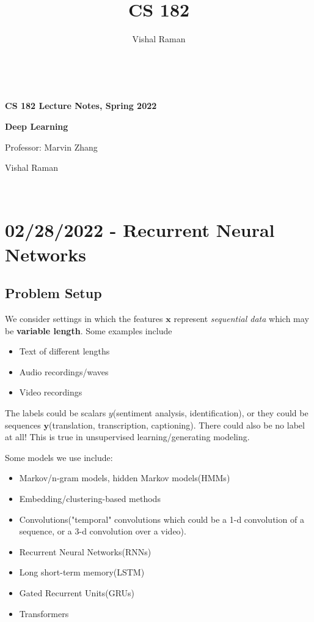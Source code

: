 \documentclass[11pt]{scrartcl}
\begin{document}
\title{CS 182}
\author{Vishal Raman}
\thispagestyle{empty}
$ $
\vfill
\begin{center}

\centerline{\huge \textbf{CS 182 Lecture Notes, Spring 2022}}
\centerline{\Large \textbf{Deep Learning} } 
\centerline{Professor: Marvin Zhang}
\centerline{Vishal Raman}
\end{center}
\vfill
$ $
\newpage
\thispagestyle{empty}
\tableofcontents
\newpage
\section{02/28/2022 - Recurrent Neural Networks}
\subsection{Problem Setup}
We consider settings in which the features $\textbf{x}$ represent \textit{sequential data} which may be \textbf{variable length}. Some examples include
\begin{itemize}
\item Text of different lengths
\item Audio recordings/waves
\item Video recordings
\end{itemize} 
The labels could be scalars $y$(sentiment analysis, identification), or they could be sequences $\textbf{y}$(translation, transcription, captioning).  There could also be 
no label at all!  This is true in unsupervised learning/generating modeling.

Some models we use include:
\begin{itemize}
\item Markov/n-gram models, hidden Markov models(HMMs)
\item Embedding/clustering-based methods
\item Convolutions("temporal" convolutions which could be a 1-d convolution of a sequence, or a 3-d convolution over a video).
\item Recurrent Neural Networks(RNNs)
\item Long short-term memory(LSTM)
\item Gated Recurrent Units(GRUs)
\item Transformers
\end{itemize}
\end{document}
